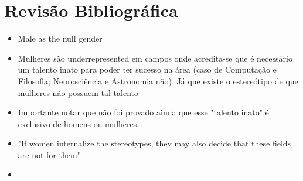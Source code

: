 \chapter{Revisão Bibliográfica}

\begin{itemize}
\item Male as the null gender
\end{itemize}

\begin{itemize}
	\item Mulheres são underrepresented em campos onde acredita-se que é necessário um talento inato para poder ter sucesso na área (caso de Computação e Filosofia; Neurosciência e Astronomia não)\cite{leslie2015expectations}. Já que existe o estereótipo de que mulheres não possuem tal talento\cite{tiedemann2000gender, kirkcaldy2007parental}
	\item Importante notar que não foi provado ainda que esse "talento inato" é exclusivo de homens ou mulheres.\cite{hyde2005gender}
	\item "If women internalize the stereotypes, they may also decide that these fields are not for them" \cite{wigfield2000expectancy}.
	\item 
\end{itemize}
